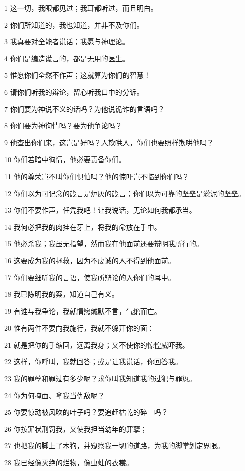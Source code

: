 \par 1 这一切，我眼都见过；我耳都听过，而且明白。
\par 2 你们所知道的，我也知道，并非不及你们。
\par 3 我真要对全能者说话；我愿与神理论。
\par 4 你们是编造谎言的，都是无用的医生。
\par 5 惟愿你们全然不作声；这就算为你们的智慧！
\par 6 请你们听我的辩论，留心听我口中的分诉。
\par 7 你们要为神说不义的话吗？为他说诡诈的言语吗？
\par 8 你们要为神徇情吗？要为他争论吗？
\par 9 他查出你们来，这岂是好吗？人欺哄人，你们也要照样欺哄他吗？
\par 10 你们若暗中徇情，他必要责备你们。
\par 11 他的尊荣岂不叫你们惧怕吗？他的惊吓岂不临到你们吗？
\par 12 你们以为可记念的箴言是炉灰的箴言；你们以为可靠的坚垒是淤泥的坚垒。
\par 13 你们不要作声，任凭我吧！让我说话，无论如何我都承当。
\par 14 我何必把我的肉挂在牙上，将我的命放在手中。
\par 15 他必杀我；我虽无指望，然而我在他面前还要辩明我所行的。
\par 16 这要成为我的拯救，因为不虔诚的人不得到他面前。
\par 17 你们要细听我的言语，使我所辩论的入你们的耳中。
\par 18 我已陈明我的案，知道自己有义。
\par 19 有谁与我争论，我就情愿缄默不言，气绝而亡。
\par 20 惟有两件不要向我施行，我就不躲开你的面：
\par 21 就是把你的手缩回，远离我身；又不使你的惊惶威吓我。
\par 22 这样，你呼叫，我就回答；或是让我说话，你回答我。
\par 23 我的罪孽和罪过有多少呢？求你叫我知道我的过犯与罪愆。
\par 24 你为何掩面、拿我当仇敌呢？
\par 25 你要惊动被风吹的叶子吗？要追赶枯乾的碎　吗？
\par 26 你按罪状刑罚我，又使我担当幼年的罪孽；
\par 27 也把我的脚上了木狗，并窥察我一切的道路，为我的脚掌划定界限。
\par 28 我已经像灭绝的烂物，像虫蛀的衣裳。

